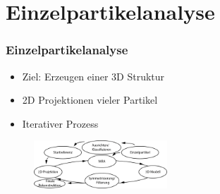 \section[EPA]{Einzelpartikelanalyse} %
\label{sec:einzelpartikelanalyse}

\begin{frame}
	\frametitle{Einzelpartikelanalyse}
	\begin{Block}
		\begin{itemize}
			\item Ziel: Erzeugen einer 3D Struktur
			\item 2D Projektionen vieler Partikel
			\item Iterativer Prozess
		\end{itemize}
		\begin{figure}
			\includegraphics[width = 5cm]{pic/epa_all.png}
		\end{figure}
	\end{Block}
\end{frame}